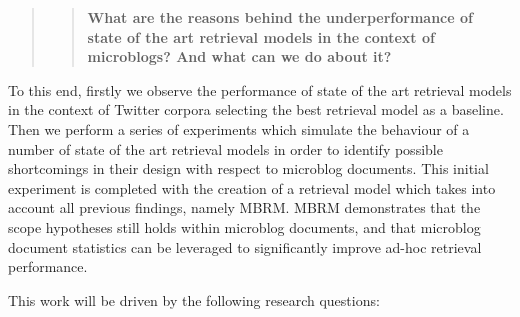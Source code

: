 \begin{quotation}\begin{quote}\textbf{What are the reasons behind the underperformance of state of the art retrieval models in the context of microblogs? And what can we do about it?}\end{quote}\end{quotation}

To this end, firstly we observe the performance of state of the art retrieval models in the context of Twitter corpora selecting the best retrieval model as a baseline. Then we perform a series of experiments which simulate the behaviour of a number of state of the art retrieval models in order to identify possible shortcomings in their design with respect to microblog documents. This initial experiment is completed with the creation of a retrieval model which takes into account all previous findings, namely MBRM. MBRM demonstrates that the scope hypotheses still holds within microblog documents, and that microblog document statistics can be leveraged to significantly improve ad-hoc retrieval performance.

%

This work will be driven by the following research questions:

